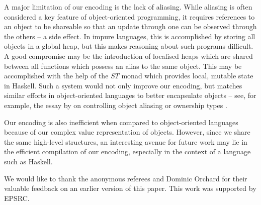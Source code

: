 \documentclass[authoryear,preprint]{sigplanconf}
\begin{document}
A major limitation of our encoding is the lack of aliasing. While aliasing is often considered a key feature of object-oriented programming, it requires references to an object to be shareable so that an update through one can be observed through the others -- a side effect. In impure languages, this is accomplished by storing all objects in a global heap, but this makes reasoning about such programs difficult. A good compromise may be the introduction of localised heaps which are shared between all functions which possess an alias to the same object. This may be accomplished with the help of the $\mathit{ST}$ monad \cite{launchbury1995state} which provides local, mutable state in Haskell. Such a system would not only improve our encoding, but matches similar efforts in object-oriented languages to better encapsulate objects -- see, for example, the essay by \citet{hogg1992geneva} on controlling object aliasing or ownership types \cite{clarke1998ownership}.

Our encoding is also inefficient when compared to object-oriented languages because of our complex value representation of objects. However, since we share the same high-level structures, an interesting avenue for future work may lie in the efficient compilation of our encoding, especially in the context of a language such as Haskell. 





\acks We would like to thank the anonymous referees and Dominic Orchard for their valuable feedback on an earlier version of this paper. This work was supported by EPSRC.






\softraggedright



\end{document}
